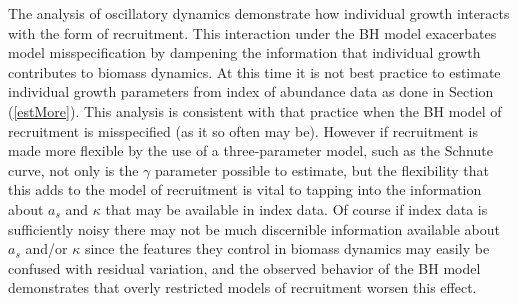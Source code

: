 
%
The analysis of oscillatory dynamics demonstrate how individual growth 
interacts with the form of recruitment. 
This interaction under the BH model exacerbates model misspecification by 
dampening the information that individual growth contributes to biomass dynamics. %
At this time it is not best practice to estimate individual growth parameters 
from index of abundance data as done in Section (\ref{estMore}). This analysis 
is consistent with that practice when the BH model of recruitment is misspecified (as it so often may be). 
However if recruitment is made more flexible by the use of a three-parameter model, 
such as the Schnute curve, not only is the $\gamma$ parameter possible to estimate, but the
flexibility that this adds to the model of recruitment is vital to tapping into 
the information about $a_s$ and $\kappa$ that may be available in index data. Of course if 
index data is sufficiently noisy there may not be much discernible information available 
about $a_s$ and/or $\kappa$ since the features they control in biomass dynamics may 
easily be confused with residual variation, and the observed behavior of the BH model 
demonstrates that overly restricted models of recruitment worsen this effect.  

